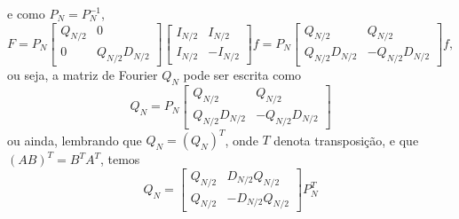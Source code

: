 e como $P_N = P_N^{-1}$,
\begin{dmath*}
  F = P_N \begin{bmatrix}
    Q_{N / 2} & 0 \\
    0 & Q_{N / 2} D_{N / 2}
    \end{bmatrix} \begin{bmatrix}
    I_{N / 2} & I_{N / 2} \\
    I_{N / 2} & -I_{N / 2}
  \end{bmatrix} f
  = P_N \begin{bmatrix}
    Q_{N / 2} & Q_{N / 2} \\
    Q_{N / 2} D_{N / 2} & -Q_{N / 2} D_{N / 2}
  \end{bmatrix} f,
\end{dmath*}
ou seja, a matriz de Fourier $Q_N$ pode ser escrita como
\begin{dmath*}
  Q_N = P_N \begin{bmatrix}
    Q_{N / 2} & Q_{N / 2} \\
    Q_{N / 2} D_{N / 2} & -Q_{N / 2} D_{N / 2}
  \end{bmatrix}
\end{dmath*}
ou ainda, lembrando que $Q_N = (Q_N)^T$, onde $T$ denota transposição, e que $(A
B)^T = B^T A^T$, temos
\begin{dmath*}
  Q_N = \begin{bmatrix}
    Q_{N / 2} & D_{N / 2} Q_{N / 2} \\
    Q_{N / 2} & -D_{N / 2} Q_{N / 2}
  \end{bmatrix} P_N^T
\end{dmath*}
